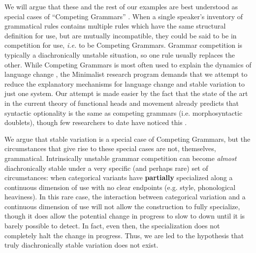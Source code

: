 We will argue that these and the rest of our examples are best understood as special cases of ``Competing Grammars'' \citep[][]{kroch1989}.
When a single speaker's inventory of grammatical rules contains multiple rules which have the same structural definition for use, but are mutually incompatible, they could be said to be in competition for use, \textsl{i.e.} to be Competing Grammars.
Grammar competition is typically a diachronically unstable situation, so one rule usually replaces the other.
While Competing Grammars is most often used to explain the dynamics of language change \citep{yang2000,yang2002}, the Minimalist research program demands that we attempt to reduce the explanatory mechanisms for language change and stable variation to just one system.
Our attempt is made easier by the fact that the state of the art in the current  theory of functional heads and movement already predicts that syntactic optionality is the same as competing grammars (i.e. morphosyntactic doublets), though few researchers to date have noticed this \citep[with the exception of][]{kroch1994}.

We argue that stable variation is a special case of Competing Grammars, but the circumstances that give rise to these special cases are not, themselves, grammatical.
Intrinsically unstable grammar competition can become \textsl{almost} diachronically stable under a very specific (and perhaps rare) set of circumstances: when categorical variants have \textbf{partially} specialized along a continuous dimension of use with no clear endpoints (e.g. style, phonological heaviness). 
In this rare case, the interaction between categorical variation and a continuous dimension of use will not allow the construction to fully specialize, though it does allow the potential change in progress to slow to down until it is barely possible to detect. In fact, even then, the specialization does not completely halt the change in progress.
Thus, we are led to the hypothesis that truly diachronically stable variation does not exist.

